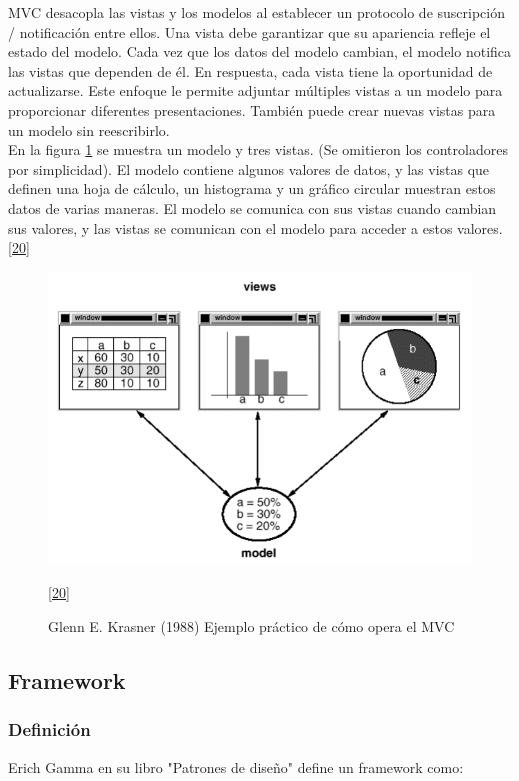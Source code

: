 MVC desacopla las vistas y los modelos al establecer un protocolo de suscripción / notificación entre ellos. Una vista debe garantizar que su apariencia refleje el estado del modelo. Cada vez que los datos del modelo cambian, el modelo notifica las vistas que dependen de él. En respuesta, cada vista tiene la oportunidad de actualizarse. Este enfoque le permite adjuntar múltiples vistas a un modelo para proporcionar diferentes presentaciones. También puede crear nuevas vistas para un modelo sin reescribirlo.\\

En la figura \ref{fig:mvc2} se muestra un modelo y tres vistas. (Se omitieron los controladores por simplicidad). El modelo contiene algunos valores de datos, y las vistas que definen una hoja de cálculo, un histograma y un gráfico circular muestran estos datos de varias maneras. El modelo se comunica con sus vistas cuando cambian sus valores, y las vistas se comunican con el modelo para acceder a estos valores. \hyperlink{b20}{[20]} 

\begin{figure}[H]
	\begin{center}
		\includegraphics[width=.65\textwidth]{images/marcoteorico/mvc2}
		\caption{Glenn E. Krasner (1988) Ejemplo práctico de cómo opera el MVC}
		\hyperlink{b20}{[20]} 
		\label{fig:mvc2}
	\end{center}
\end{figure}

\subsection{Framework}

\subsubsection{Definición}

Erich Gamma en su libro "Patrones de diseño" define un framework como:\\

